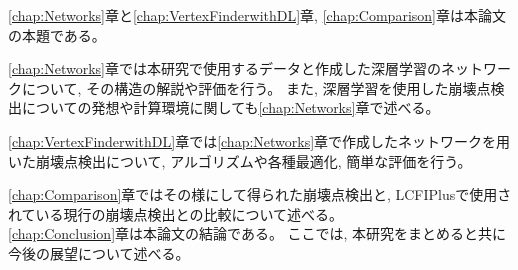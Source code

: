 \ref{chap:Networks}章と\ref{chap:VertexFinderwithDL}章, \ref{chap:Comparison}章は本論文の本題である。

\ref{chap:Networks}章では本研究で使用するデータと作成した深層学習のネットワークについて, その構造の解説や評価を行う。
また, 深層学習を使用した崩壊点検出についての発想や計算環境に関しても\ref{chap:Networks}章で述べる。

\ref{chap:VertexFinderwithDL}章では\ref{chap:Networks}章で作成したネットワークを用いた崩壊点検出について, アルゴリズムや各種最適化, 簡単な評価を行う。

\ref{chap:Comparison}章ではその様にして得られた崩壊点検出と, LCFIPlusで使用されている現行の崩壊点検出との比較について述べる。\\

\ref{chap:Conclusion}章は本論文の結論である。
ここでは, 本研究をまとめると共に今後の展望について述べる。

















